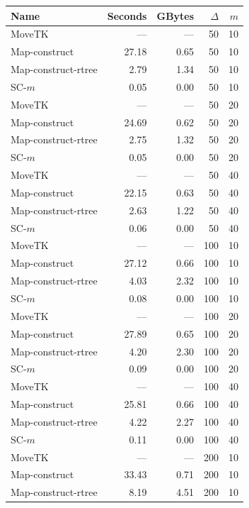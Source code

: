 \documentclass[11pt]{article}
\begin{document}
    \begin{figure} \begin{center}
    \begin{minipage}{0.5\textwidth}
    \begin{tabular}{@{}lrrrr@{}}
        \toprule
        Name & Seconds & GBytes & $\Delta$ & $m$\\
        \midrule
        MoveTK & --- & --- & 50 & 10\\
Map-construct & 27.18 & 0.65 & 50 & 10\\
Map-construct-rtree & 2.79 & 1.34 & 50 & 10\\
        \medskip
SC-$m$ & 0.05 & 0.00 & 50 & 10\\
        MoveTK & --- & --- & 50 & 20\\
Map-construct & 24.69 & 0.62 & 50 & 20\\
Map-construct-rtree & 2.75 & 1.32 & 50 & 20\\
        \medskip
SC-$m$ & 0.05 & 0.00 & 50 & 20\\
        MoveTK & --- & --- & 50 & 40\\
Map-construct & 22.15 & 0.63 & 50 & 40\\
Map-construct-rtree & 2.63 & 1.22 & 50 & 40\\
        \medskip
SC-$m$ & 0.06 & 0.00 & 50 & 40\\
        MoveTK & --- & --- & 100 & 10\\
Map-construct & 27.12 & 0.66 & 100 & 10\\
Map-construct-rtree & 4.03 & 2.32 & 100 & 10\\
        \medskip
SC-$m$ & 0.08 & 0.00 & 100 & 10\\
        MoveTK & --- & --- & 100 & 20\\
Map-construct & 27.89 & 0.65 & 100 & 20\\
Map-construct-rtree & 4.20 & 2.30 & 100 & 20\\
        \medskip
SC-$m$ & 0.09 & 0.00 & 100 & 20\\
        MoveTK & --- & --- & 100 & 40\\
Map-construct & 25.81 & 0.66 & 100 & 40\\
Map-construct-rtree & 4.22 & 2.27 & 100 & 40\\
        \medskip
SC-$m$ & 0.11 & 0.00 & 100 & 40\\
        MoveTK & --- & --- & 200 & 10\\
Map-construct & 33.43 & 0.71 & 200 & 10\\
Map-construct-rtree & 8.19 & 4.51 & 200 & 10\\

\end{tabular}
\end{minipage}
\end{center}
\end{figure}
\end{document}
